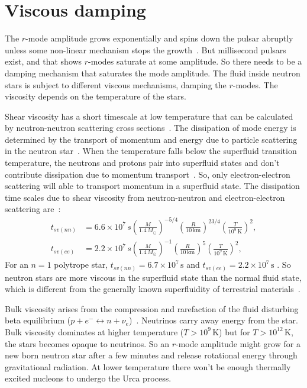 \documentclass{ttuthes2007}
\begin{document}
\section{Viscous damping}
The $r$-mode amplitude grows exponentially and spins down the pulsar abruptly
unless some non-linear mechanism stops the growth~\cite{}. But millisecond
pulsars exist, and that shows $r$-modes saturate at some amplitude. So there
needs to be a damping mechanism that saturates the mode amplitude. The fluid
inside neutron stars is subject to different viscous mechanisms, damping the
$r$-modes. The viscosity depends on the temperature of the stars.

Shear viscosity has a short timescale at low temperature that can be
calculated by neutron-neutron scattering cross sections~\cite{Owen_2000}. The dissipation
of mode energy is determined by the transport of momentum and energy due to
particle scattering in the neutron star~\cite{1987ApJ...314..234C}. When
the temperature falls below the superfluid transition temperature, the neutrons
and protons pair into superfluid states and don't contribute dissipation due to
momentum transport~\cite{1987ApJ...314..234C}. So, only electron-electron
scattering will able to transport momentum in a superfluid state. The
dissipation time scales due to shear viscosity from neutron-neutron and
electron-electron scattering are~\cite{ANDERSSON_2001}:
\begin{align*}
t_{sv(nn)}&=6.6\times10^7
\,s\left(\frac{M}{1.4\,M_\odot}\right)^{-5/4}\left(\frac{R}{10\,\mathrm{km}}\right)^{23/4}\left(\frac{T}{10^9\,\mathrm{K}}\right)^2,\\
t_{sv(ee)}&=2.2\times10^7\,s\left(\frac{M}{1.4\,M_\odot}\right)^{-1}\left(\frac{R}{10\,\mathrm{km}}\right)^5\left(\frac{T}{10^9\,\mathrm{K}}\right)^2,
\end{align*}
For an $n=1$ polytrope star, $t_{sv(nn)}=6.7\times 10^7\,\mathrm{s}$ and
$t_{sv(ee)}=2.2\times 10^7\,\mathrm{s}$ . So neutron stars are more viscous in the superfluid
state than the normal fluid state, which is different from the generally known
superfluidity of terrestrial materials~\cite{1987ApJ...314..234C}.

Bulk viscosity arises from the compression and rarefaction of the fluid
disturbing beta equilibrium ($p+e^- \leftrightarrow n +
\nu_e$)~\cite{Owen_2000}. Neutrinos carry away energy from the star.
Bulk viscosity dominates at higher temperature ($T>10^9\,\mathrm{K}$) but for $T > 10^{12}
\,\mathrm{K}$, the stars becomes opaque to neutrinos. So an $r$-mode amplitude might grow
for a new born neutron star after a few minutes and release rotational energy through
gravitational radiation. At lower temperature there won't be enough thermally
excited nucleons to undergo the Urca process.
\end{document}
